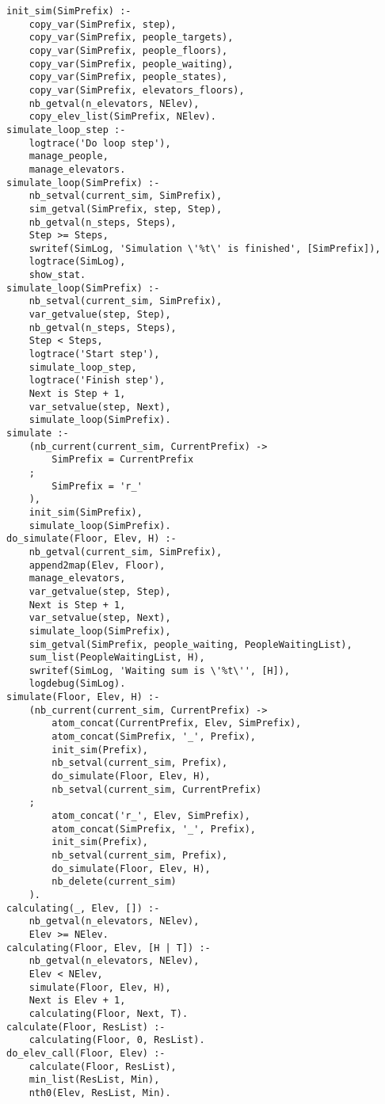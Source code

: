 
\begin{lstlisting}[basicstyle=\scriptsize]
init_sim(SimPrefix) :-
	copy_var(SimPrefix, step),
	copy_var(SimPrefix, people_targets),
	copy_var(SimPrefix, people_floors),
	copy_var(SimPrefix, people_waiting),
	copy_var(SimPrefix, people_states),
	copy_var(SimPrefix, elevators_floors),
	nb_getval(n_elevators, NElev),
	copy_elev_list(SimPrefix, NElev).
simulate_loop_step :-
	logtrace('Do loop step'),
	manage_people,
	manage_elevators.
simulate_loop(SimPrefix) :-
	nb_setval(current_sim, SimPrefix),
	sim_getval(SimPrefix, step, Step),
	nb_getval(n_steps, Steps),
	Step >= Steps,
	swritef(SimLog, 'Simulation \'%t\' is finished', [SimPrefix]),
	logtrace(SimLog),
	show_stat.
simulate_loop(SimPrefix) :-
	nb_setval(current_sim, SimPrefix),
	var_getvalue(step, Step),
	nb_getval(n_steps, Steps),
	Step < Steps,
	logtrace('Start step'),
	simulate_loop_step,
	logtrace('Finish step'),
	Next is Step + 1,
	var_setvalue(step, Next),
	simulate_loop(SimPrefix).
simulate :-
	(nb_current(current_sim, CurrentPrefix) ->
		SimPrefix = CurrentPrefix
	;
		SimPrefix = 'r_'
	),
	init_sim(SimPrefix),
	simulate_loop(SimPrefix).
do_simulate(Floor, Elev, H) :-
	nb_getval(current_sim, SimPrefix),
	append2map(Elev, Floor),
	manage_elevators,
	var_getvalue(step, Step),
	Next is Step + 1,
	var_setvalue(step, Next),
	simulate_loop(SimPrefix),
	sim_getval(SimPrefix, people_waiting, PeopleWaitingList),
	sum_list(PeopleWaitingList, H),
	swritef(SimLog, 'Waiting sum is \'%t\'', [H]),
	logdebug(SimLog).
simulate(Floor, Elev, H) :-
	(nb_current(current_sim, CurrentPrefix) ->
		atom_concat(CurrentPrefix, Elev, SimPrefix),
		atom_concat(SimPrefix, '_', Prefix),
		init_sim(Prefix),
		nb_setval(current_sim, Prefix),
		do_simulate(Floor, Elev, H),
		nb_setval(current_sim, CurrentPrefix)
	;
		atom_concat('r_', Elev, SimPrefix),
		atom_concat(SimPrefix, '_', Prefix),
		init_sim(Prefix),
		nb_setval(current_sim, Prefix),
		do_simulate(Floor, Elev, H),
		nb_delete(current_sim)
	).
calculating(_, Elev, []) :-
	nb_getval(n_elevators, NElev),
   	Elev >= NElev.
calculating(Floor, Elev, [H | T]) :-
	nb_getval(n_elevators, NElev),
   	Elev < NElev,
	simulate(Floor, Elev, H),
	Next is Elev + 1,
	calculating(Floor, Next, T).
calculate(Floor, ResList) :-
	calculating(Floor, 0, ResList).
do_elev_call(Floor, Elev) :-
	calculate(Floor, ResList),
	min_list(ResList, Min),
	nth0(Elev, ResList, Min).
\end{lstlisting}
